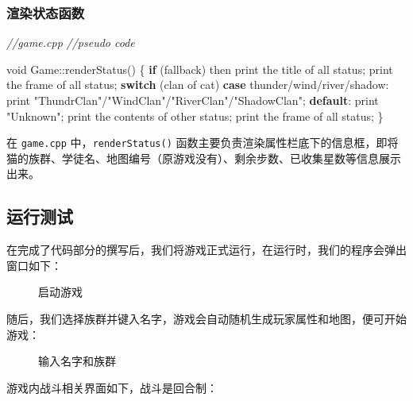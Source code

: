 \documentclass[hyperref,UTF8,a4paper]{ctexart}
\newenvironment{Shaded}{}{}
\newcommand{\CommentTok}[1]{\textcolor[rgb]{0.38,0.63,0.69}{\textit{#1}}}
\newcommand{\ControlFlowTok}[1]{\textcolor[rgb]{0.00,0.44,0.13}{\textbf{#1}}}
\newcommand{\DataTypeTok}[1]{\textcolor[rgb]{0.56,0.13,0.00}{#1}}
\newcommand{\NormalTok}[1]{#1}
\newcommand{\StringTok}[1]{\textcolor[rgb]{0.25,0.44,0.63}{#1}}
\newcommand{\includegraphicx}[1]{\maxsizebox{\textwidth}{\textheight}{\texttt{[image: \#1]}}}
\begin{document}
\hypertarget{ux6e32ux67d3ux72b6ux6001ux51fdux6570}{%
\subsubsection{渲染状态函数}\label{ux6e32ux67d3ux72b6ux6001ux51fdux6570}}

\begin{Shaded}
\begin{Highlighting}[]
\CommentTok{//game.cpp}
\CommentTok{//pseudo code}

\DataTypeTok{void}\NormalTok{ Game::renderStatus()}
\NormalTok{\{}
    \ControlFlowTok{if}\NormalTok{ (fallback) then}
\NormalTok{        print the title of all status;}
\NormalTok{        print the frame of all status;}
    \ControlFlowTok{switch}\NormalTok{ (clan of cat)}
        \ControlFlowTok{case}\NormalTok{ thunder/wind/river/shadow: print }\StringTok{"ThundrClan"}\NormalTok{/}\StringTok{"WindClan"}\NormalTok{/}\StringTok{"RiverClan"}\NormalTok{/}\StringTok{"ShadowClan"}\NormalTok{;}
        \ControlFlowTok{default}\NormalTok{: print }\StringTok{"Unknown"}\NormalTok{;}
\NormalTok{    print the contents of other status;}
\NormalTok{    print the frame of all status;}
\NormalTok{\}}
\end{Highlighting}
\end{Shaded}

在 \texttt{game.cpp} 中，\texttt{renderStatus()}
函数主要负责渲染属性栏底下的信息框，即将猫的族群、学徒名、地图编号（原游戏没有）、剩余步数、已收集星数等信息展示出来。

\hypertarget{ux8fd0ux884cux6d4bux8bd5}{%
\subsection{运行测试}\label{ux8fd0ux884cux6d4bux8bd5}}

在完成了代码部分的撰写后，我们将游戏正式运行，在运行时，我们的程序会弹出窗口如下：

\begin{figure}[H]
\centering
\includegraphicx{img/gamestart.png}
\caption{启动游戏}
\end{figure}

随后，我们选择族群并键入名字，游戏会自动随机生成玩家属性和地图，便可开始游戏：

\begin{figure}[H]
\centering
\includegraphicx{img/getname_clan.png}
\caption{输入名字和族群}
\end{figure}

游戏内战斗相关界面如下，战斗是回合制：
\end{document}

